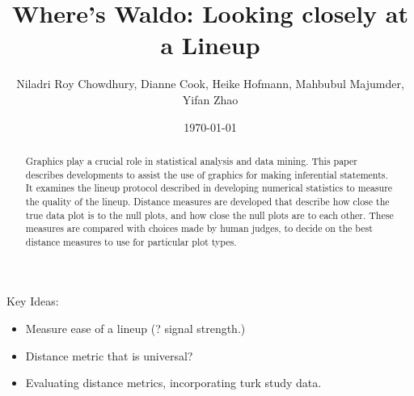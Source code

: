 \documentclass[12]{article}
\begin{document}
\title{Where's Waldo: Looking closely at a Lineup}
\author{Niladri Roy Chowdhury, Dianne Cook, Heike Hofmann, Mahbubul Majumder, Yifan Zhao}
\date{\today}  %
\maketitle

\begin {abstract} 
Graphics play a crucial role in statistical analysis and data mining. This paper describes developments to assist the use of graphics for making inferential statements. It examines the lineup protocol described in \citet{buja:2009}  
  developing numerical statistics to measure the quality of the lineup. Distance measures are developed that describe how close the true data plot is to the null plots, and how close the null plots are to each other. These measures are compared with choices made by human judges, to decide on the best distance measures to use for particular plot types.

\end {abstract}


{\color{red} Key Ideas:
 \begin{itemize}
\item Measure ease of a lineup (? signal strength.)
\item Distance metric that is universal?
\item Evaluating distance metrics, incorporating turk study data.
\end{itemize}}
\end{document}
